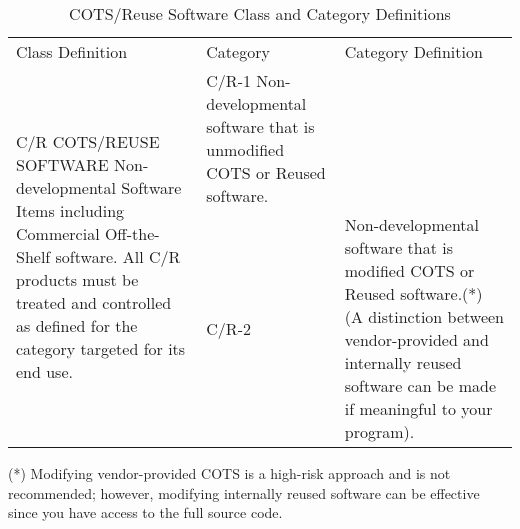 \documentclass{book}
\begin{document}
\begin{table}
	\caption{COTS/Reuse Software Class and Category Definitions}
	\begin{tabular}[m]{|l|l|l|}
		Class Definition & Category & Category Definition \\
		\multirow{2}{*}{C/R
			COTS/REUSE SOFTWARE
			Non-developmental Software Items including Commercial
			Off-the-Shelf software.
			All C/R products must be treated and controlled as defined
			for the category targeted for its end use.}
		& C/R-1
		Non-developmental software that is
		unmodified COTS or Reused software. \\
		& C/R-2
		& Non-developmental software that is
		modified COTS or Reused software.(*) (A
		distinction between vendor-provided and
		internally reused software can be made if
		meaningful to your program). \\
	\end{tabular}
\end{table}

(*) Modifying vendor-provided COTS is a high-risk approach and is not recommended; however, modifying internally
reused software can be effective since you have access to the full source code.
\end{document}
